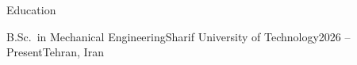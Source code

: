 \begin{section}{Education}

    \begin{subsectionnobullet}{B.Sc.\ in Mechanical Engineering}{Sharif University of Technology}{2026 -- Present}{Tehran, Iran}
    \end{subsectionnobullet}

\end{section}
